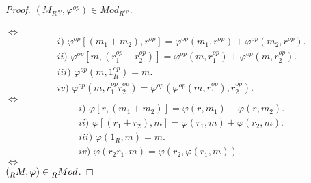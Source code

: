 \documentclass{article}
\theoremstyle{definition}
\theoremstyle{plain}
\theoremstyle{plain}
\theoremstyle{definition}
\theoremstyle{definition}
\theoremstyle{definition}
\theoremstyle{definition}
\theoremstyle{definition}
\theoremstyle{definition}
\begin{document}
\begin{enumerate}[label=\textbf{Ej \arabic*.}]
\begin{proof}
			$(M_{R^{op}},\varphi^{op})\in Mod_{R^{op}}$.\\\\
			$\iff$
			\begin{align*}
				& i)\,\,\varphi^{op}[(m_1+m_2),r^{op}]=\varphi^{op}(m_1,r^{op})+\varphi^{op}(m_2,r^{op}).\\
				& ii)\,\,\varphi^{op}[m,(r_1^{op}+r_2^{op})]=\varphi^{op}(m,r_1^{op})+\varphi^{op}(m,r_2^{op}).\\
				& iii)\,\, \varphi^{op}(m,1_R^{op})=m.\\
				& iv)\,\, \varphi^{op}(m,r_1^{op}r_2^{op})=\varphi^{op}(\varphi^{op}(m,r_1^{op}),r_2^{op}).
			\end{align*}
			$\iff$
			\begin{align*}
				& i)\,\,\varphi[r,(m_1+m_2)]=\varphi(r,m_1)+\varphi(r,m_2).\\
				& ii)\,\,\varphi[(r_1+r_2),m]=\varphi(r_1,m)+\varphi(r_2,m).\\
				& iii)\,\, \varphi(1_R,m)=m.\\
				& iv)\,\, \varphi(r_2r_1,m)=\varphi(r_2,\varphi(r_1,m)).
			\end{align*}
			$\iff$\\
			
			$(\prescript{}{R}{M},\varphi)\in  \prescript{}{R}{Mod}$.
		\end{proof}
		

\end{enumerate}
\end{document}
